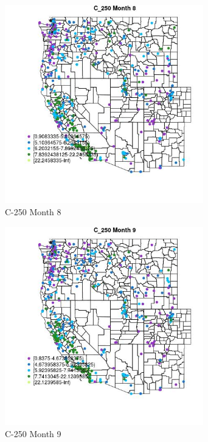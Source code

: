 \begin{figure} 
\centering  
\includegraphics[width=0.77\textwidth]{Code_Outputs/ML_input_report_ML_input_PM25_Step5_part_d_de_duplicated_aves_ML_input_MapObsMo8C_250.jpg} 
\caption{\label{fig:ML_input_report_ML_input_PM25_Step5_part_d_de_duplicated_aves_ML_inputMapObsMo8C_250}C-250 Month 8} 
\end{figure} 
 

\begin{figure} 
\centering  
\includegraphics[width=0.77\textwidth]{Code_Outputs/ML_input_report_ML_input_PM25_Step5_part_d_de_duplicated_aves_ML_input_MapObsMo9C_250.jpg} 
\caption{\label{fig:ML_input_report_ML_input_PM25_Step5_part_d_de_duplicated_aves_ML_inputMapObsMo9C_250}C-250 Month 9} 
\end{figure} 
 

